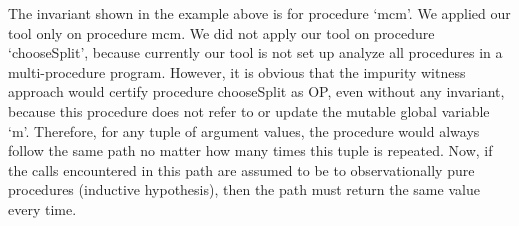 The invariant shown in the example above is for procedure `mcm'. We applied
our tool only on procedure mcm. We did not apply our tool on procedure
`chooseSplit', because currently our tool is not set up analyze all
procedures in a multi-procedure program. However, it is obvious that the
impurity witness approach would certify procedure chooseSplit as OP, even
without any invariant, because this procedure does not refer to or update
the mutable global variable `m'. Therefore, for any tuple of argument
values, the procedure would always follow the same path no matter how many
times this tuple is repeated. Now, if the calls encountered in this path
are assumed to be to observationally pure procedures (inductive
hypothesis), then the path must return the same value every time.
